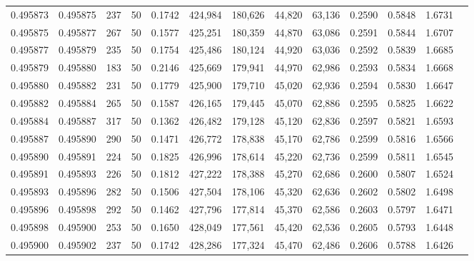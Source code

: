 \begin{tabular}{rrrrrrrrrrrrr}
0.495873 & 0.495875 &   237 &  50 &                                     0.1742 & 424,984 & 180,626 &  44,820 &  63,136 & 0.2590 & 0.5848 & 1.6731 \\
0.495875 & 0.495877 &   267 &  50 &                                     0.1577 & 425,251 & 180,359 &  44,870 &  63,086 & 0.2591 & 0.5844 & 1.6707 \\
0.495877 & 0.495879 &   235 &  50 &                                     0.1754 & 425,486 & 180,124 &  44,920 &  63,036 & 0.2592 & 0.5839 & 1.6685 \\
0.495879 & 0.495880 &   183 &  50 &                                     0.2146 & 425,669 & 179,941 &  44,970 &  62,986 & 0.2593 & 0.5834 & 1.6668 \\
0.495880 & 0.495882 &   231 &  50 &                                     0.1779 & 425,900 & 179,710 &  45,020 &  62,936 & 0.2594 & 0.5830 & 1.6647 \\
0.495882 & 0.495884 &   265 &  50 &                                     0.1587 & 426,165 & 179,445 &  45,070 &  62,886 & 0.2595 & 0.5825 & 1.6622 \\
0.495884 & 0.495887 &   317 &  50 &                                     0.1362 & 426,482 & 179,128 &  45,120 &  62,836 & 0.2597 & 0.5821 & 1.6593 \\
0.495887 & 0.495890 &   290 &  50 &                                     0.1471 & 426,772 & 178,838 &  45,170 &  62,786 & 0.2599 & 0.5816 & 1.6566 \\
0.495890 & 0.495891 &   224 &  50 &                                     0.1825 & 426,996 & 178,614 &  45,220 &  62,736 & 0.2599 & 0.5811 & 1.6545 \\
0.495891 & 0.495893 &   226 &  50 &                                     0.1812 & 427,222 & 178,388 &  45,270 &  62,686 & 0.2600 & 0.5807 & 1.6524 \\
0.495893 & 0.495896 &   282 &  50 &                                     0.1506 & 427,504 & 178,106 &  45,320 &  62,636 & 0.2602 & 0.5802 & 1.6498 \\
0.495896 & 0.495898 &   292 &  50 &                                     0.1462 & 427,796 & 177,814 &  45,370 &  62,586 & 0.2603 & 0.5797 & 1.6471 \\
0.495898 & 0.495900 &   253 &  50 &                                     0.1650 & 428,049 & 177,561 &  45,420 &  62,536 & 0.2605 & 0.5793 & 1.6448 \\
0.495900 & 0.495902 &   237 &  50 &                                     0.1742 & 428,286 & 177,324 &  45,470 &  62,486 & 0.2606 & 0.5788 & 1.6426 \\

\end{tabular}
